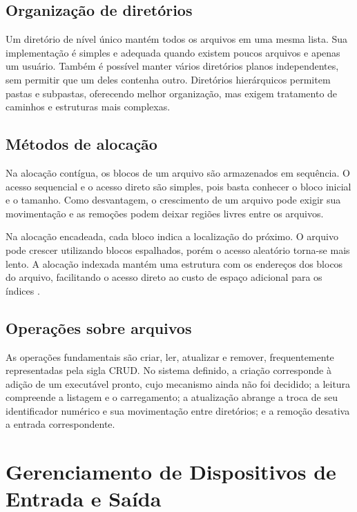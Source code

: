 \documentclass[
    12pt,
    openright,
    a4paper,
    english,
    brazilian
]{abntex2}
\begin{document}
\subsection{Organização de diretórios}

Um diretório de nível único mantém todos os arquivos em uma mesma lista. Sua implementação é simples e adequada quando existem poucos arquivos e apenas um usuário. Também é possível manter vários diretórios planos independentes, sem permitir que um deles contenha outro. Diretórios hierárquicos permitem pastas e subpastas, oferecendo melhor organização, mas exigem tratamento de caminhos e estruturas mais complexas.

\subsection{Métodos de alocação}

Na alocação contígua, os blocos de um arquivo são armazenados em sequência. O acesso sequencial e o acesso direto são simples, pois basta conhecer o bloco inicial e o tamanho. Como desvantagem, o crescimento de um arquivo pode exigir sua movimentação e as remoções podem deixar regiões livres entre os arquivos.

Na alocação encadeada, cada bloco indica a localização do próximo. O arquivo pode crescer utilizando blocos espalhados, porém o acesso aleatório torna-se mais lento. A alocação indexada mantém uma estrutura com os endereços dos blocos do arquivo, facilitando o acesso direto ao custo de espaço adicional para os índices \cite{silberschatz2015,arpaci2018}.

\subsection{Operações sobre arquivos}

As operações fundamentais são criar, ler, atualizar e remover, frequentemente representadas pela sigla CRUD. No sistema definido, a criação corresponde à adição de um executável pronto, cujo mecanismo ainda não foi decidido; a leitura compreende a listagem e o carregamento; a atualização abrange a troca de seu identificador numérico e sua movimentação entre diretórios; e a remoção desativa a entrada correspondente.

\section{Gerenciamento de Dispositivos de Entrada e Saída}
\end{document}
